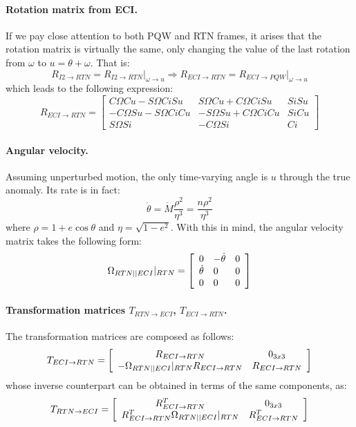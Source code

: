 			\paragraph{Rotation matrix from ECI. \\}
			\indent If we pay close attention to both PQW and RTN frames, it arises that the rotation matrix is virtually the same, only changing the value of the last rotation from $\omega$ to $u = \theta + \omega$. That is:
			\[
			R_{I2 \to RTN} = R_{I2\to RTN} \rvert_{\omega \to u} \Rightarrow R_{ECI\to RTN} = R_{ECI\to PQW}\rvert_{\omega \to u}
			\]
			\noindent which leads to the following expression:
			\[
			R_{ECI\to RTN} = \left[ \begin{array}{lll}
			C\Omega C u - S\Omega C i S u 			& S\Omega C u + C\Omega C i S u & S i S u \\
			-C\Omega S u - S\Omega C i C u 			& -S\Omega S u + C\Omega C i C u & S i C u \\
			S\Omega S i 							& - C\Omega S i 			& C i
			\end{array}\right]
			\]
			\paragraph{Angular velocity. \\}
			\indent Assuming unperturbed motion, the only time-varying angle is $u$ through the true anomaly. Its rate is in fact:
			\[
			\dot{\theta} = \dot{M} \dfrac{\rho^2}{\eta^{3}} = \dfrac{n \rho^2}{\eta^3}
			\]
			\noindent where $\rho = 1 + e \cos\theta$ and $\eta = \sqrt{1 - e^2}$. With this in mind, the angular velocity matrix takes the following form:
			\[
			\Omega_{RTN\vert \vert ECI}\rvert_{RTN} = \left[ \begin{array}{lll}
			0 			& -\dot{\theta} 	& 0 \\
			\dot{\theta} & 0 			& 0 \\
			0 			& 0 			& 0
			\end{array}\right]
			\]
			\paragraph{Transformation matrices $T_{RTN\rightarrow ECI}$, $T_{ECI\rightarrow RTN}$. \\}
			\indent The transformation matrices are composed as follows:
			\[
			 T_{ECI\to RTN} = \left[\begin{array}{cc}
	R_{ECI\to RTN} & 0_{3x3} \\
	-\Omega_{RTN \vert \vert ECI}\rvert_{RTN} R_{ECI\to RTN}   & R_{ECI\to RTN} 
	\end{array}\right]
			\]
			\noindent whose inverse counterpart can be obtained in terms of the same components, as:
			\[
			 T_{RTN\to ECI} = \left[\begin{array}{cc}
	R_{ECI\to RTN}^T & 0_{3x3} \\
	R_{ECI\to RTN}^T\Omega_{RTN \vert \vert ECI}\rvert_{RTN} & R_{ECI\to RTN}^T
	\end{array}\right]
			\]
			
